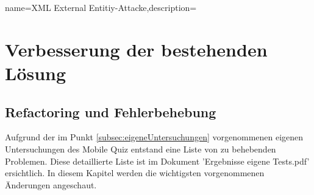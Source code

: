 
 {name={XML External Entitiy-Attacke},description={}} %

\section{Verbesserung der bestehenden Lösung}

\subsection{\gls{Refactoring} und Fehlerbehebung}
Aufgrund der im Punkt \ref{subsec:eigeneUntersuchungen} vorgenommenen eigenen Untersuchungen des Mobile Quiz entstand eine Liste von zu behebenden Problemen. Diese detaillierte Liste ist im Dokument 'Ergebnisse eigene Tests.pdf' ersichtlich. In diesem Kapitel werden die wichtigsten vorgenommenen Änderungen angeschaut.

